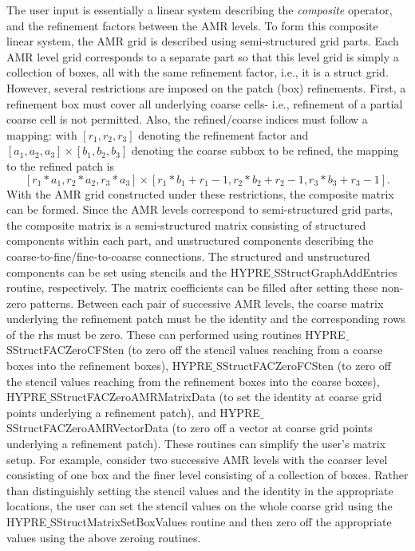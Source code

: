 The user input is essentially a linear system describing the {\it composite}
operator, and the refinement factors between the AMR levels. To form this composite linear system,
the AMR grid is described using semi-structured grid parts. Each AMR level grid corresponds to
a separate part so that this level grid is simply a collection of boxes, all with the same refinement
factor, i.e., it is a struct grid. However, several restrictions are imposed on the patch (box) refinements.
First, a refinement box must cover all underlying coarse cells- i.e., refinement of a partial coarse cell 
is not permitted. Also, the refined/coarse indices must follow a mapping: with $[r_1,r_2,r_3]$ denoting the
refinement factor and $[a_1,a_2,a_3] \times [b_1,b_2,b_3]$ denoting the coarse subbox to be refined, the
mapping to the refined patch is 
\[ [r_1*a_1,r_2*a_2,r_3*a_3] \times [r_1*b_1+ r_1-1, r_2*b_2+ r_2-1,r_3*b_3+ r_3-1]. \]
With the AMR grid constructed under these restrictions,
the composite matrix can be formed. Since the AMR levels correspond to semi-structured grid parts, the
composite matrix is a semi-structured matrix consisting of structured components within each part, and
unstructured components describing the coarse-to-fine/fine-to-coarse connections. The structured and
unstructured components can be set using stencils and the HYPRE$\_$SStructGraphAddEntries routine, respectively.
The matrix coefficients can be filled after setting these non-zero patterns. Between each pair of
successive AMR levels, the coarse matrix underlying the refinement patch must be the identity and the corresponding
rows of the rhs must be zero. These can performed using routines HYPRE$\_$SStructFACZeroCFSten (to zero off
the stencil values reaching from a coarse boxes into the refinement boxes), HYPRE$\_$SStructFACZeroFCSten
(to zero off the stencil values reaching from the refinement boxes into the coarse boxes),
HYPRE$\_$SStructFACZeroAMRMatrixData (to set the identity at coarse grid points underlying a refinement patch),
and HYPRE$\_$SStructFACZeroAMRVectorData (to zero off a vector at coarse grid points underlying a refinement patch).
These routines can simplify the user's matrix setup. For example, consider two successive AMR levels with the
coarser level consisting of one box and the finer level consisting of a collection of boxes. Rather than 
distinguishly setting the stencil values and the identity in the appropriate locations, the user can set the
stencil values on the whole coarse grid using the HYPRE$\_$SStructMatrixSetBoxValues routine and then
zero off the appropriate values using the above zeroing routines.

